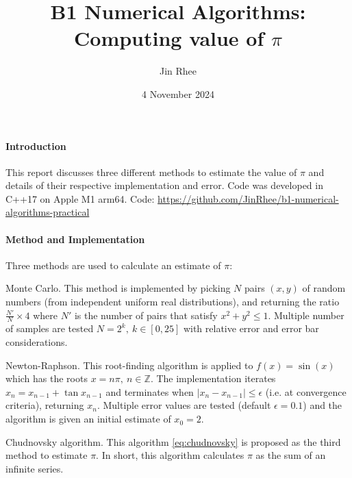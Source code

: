 \documentclass[11pt]{article}
\title{B1 Numerical Algorithms: Computing value of $\pi$}
\author{Jin Rhee}
\date{4 November 2024}
\begin{document}
\maketitle

\thispagestyle{empty}
\paragraph{Introduction} This report discusses three different methods to estimate the value of $\pi$ and details of their respective implementation and error.
Code was developed in C++17 on Apple M1 arm64. Code: \url{https://github.com/JinRhee/b1-numerical-algorithms-practical}
\paragraph{Method and Implementation}
Three methods are used to calculate an estimate of $
\pi$:
    
\par{Monte Carlo.}
This method is implemented by picking $N$ pairs $(x,y)$ of random numbers (from independent uniform real distributions),
and returning the ratio $\frac{N'}{N}\times 4$ where $N'$ is the number of pairs that satisfy $x^2+y^2 \leq 1$.
Multiple number of samples are tested $N=2^{k},\ k\in[0, 25]$ with relative error and error bar considerations.
\par{Newton-Raphson.}
This root-finding algorithm is applied to $f(x) = \sin(x)$ which has the roots $x=n\pi,\ n\in \mathbb{Z}$. The implementation
iterates $x_n=x_{n-1}+\tan{x_{n-1}}$ and terminates when $|x_n - x_{n-1}| \leq \epsilon$ (i.e. at convergence criteria), returning $x_n$.
Multiple error values are tested (default $\epsilon=0.1$) and the algorithm is given an initial estimate of $x_0=2$.
\par{Chudnovsky algorithm.}
This algorithm \ref{eq:chudnovsky} is proposed as the third method to estimate $\pi$. In short, this algorithm calculates
$\pi$ as the sum of an infinite series.
\end{document}

